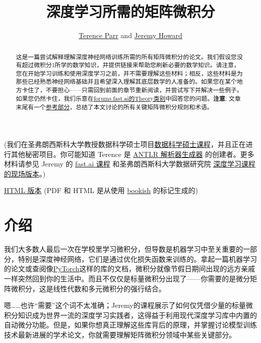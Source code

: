 \documentclass[11pt]{article}
\title{深度学习所需的矩阵微积分}
\author{
\href{http://explained.ai}{Terence Parr} and \href{http://www.fast.ai/about/\#jeremy}{Jeremy Howard}
}
\begin{document}
\maketitle


(我们在圣弗朗西斯科大学教授数据科学硕士项目\href{https://www.usfca.edu/arts-sciences/graduate-programs/data-science}{数据科学硕士课程}，并且正在进行其他秘密项目。你可能知道 Terence 是 \href{http://www.antlr.org}{ANTLR 解析器生成器} 的创建者。更多材料请参见 Jeremy 的 \href{http://course.fast.ai}{fast.ai 课程} 和圣弗朗西斯科大学数据研究院 \href{https://www.usfca.edu/data-institute/certificates/deep-learning-part-one}{深度学习课程的现场版本}。)

\href{http://explained.ai/matrix-calculus/index.html}{HTML 版本} (PDF 和 HTML 是从使用 \href{https://github.com/parrt/bookish}{bookish} 的标记生成的)


\begin{abstract}

这是一篇尝试解释理解深度神经网络训练所需的所有矩阵微积分的论文。我们假设您没有超过微积分1所学的数学知识，并提供链接来帮助您刷新必要的数学知识。请注意，您在开始学习训练和使用深度学习之前，并不需要理解这些材料；相反，这些材料是为那些已经熟悉神经网络基础并且希望深入理解其底层数学的人准备的。如果您在某个地方卡住了，不要担心——只需回到前面的章节重新阅读，并尝试写下并解决一些例子。如果您仍然卡住，我们乐意在\href{http://forums.fast.ai/c/theory}{forums.fast.ai的Theory类别}中回答您的问题。{\bf 注意}: 文章末尾有一个\href{\#reference}{参考部分}，总结了本文讨论的所有关键矩阵微积分规则和术语。

\end{abstract}

\pagebreak
{\small \setlength{\parskip}{0pt} \tableofcontents}
\pagebreak


\section{介绍}\label{intro}


我们大多数人最后一次在学校里学习微积分，但导数是机器学习中至关重要的一部分，特别是深度神经网络，它们是通过优化损失函数来训练的。拿起一篇机器学习的论文或查阅像\href{http://pytorch.org}{PyTorch}这样的库的文档，微积分就像节假日期间出现的远方亲戚一样突然回到你的生活中。而且不仅仅是标量微积分出现了——你需要的是微分矩阵微积分，这是线性代数和多元微积分的强行结合。

嗯……也许“需要”这个词不太准确；Jeremy的课程展示了如何仅凭借少量的标量微积分知识成为世界一流的深度学习实践者，这得益于利用现代深度学习库中内置的自动微分功能。但是，如果你想真正理解这些库背后的原理，并掌握讨论模型训练技术最新进展的学术论文，你就需要理解矩阵微积分领域中某些关键部分。
\end{document}
